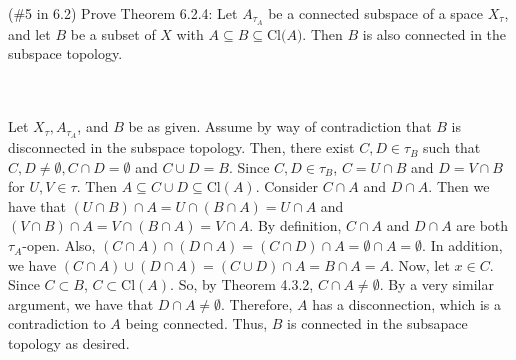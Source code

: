 (\#5 in 6.2) Prove Theorem 6.2.4: Let $A_{\tau_A}$ be a connected subspace of a space $X_{\tau}$, and
let $B$ be a subset of $X$ with $A\subseteq B\subseteq \text{Cl($A$)}$. Then $B$ is also connected in
the subspace topology.\\\\

\begin{solution}\renewcommand{\qedsymbol}{}\ \\
    Let $X_{\tau}, A_{\tau_A}$, and $B$ be as given. Assume by way of contradiction that $B$ is
    disconnected in the subspace topology. Then, there exist $C,D\in\tau_{B}$ such that
    $C,D\neq\emptyset, C\cap D=\emptyset$ and $C\cup D=B$. Since $C,D\in\tau_{B}$, $C=U\cap B$ and
    $D=V\cap B$ for $U,V\in\tau$. Then $A\subseteq C\cup D\subseteq$Cl$(A)$. Consider $C\cap A$ and
    $D\cap A$. Then we have that $(U\cap B)\cap A=U\cap(B\cap A)=U\cap A$ and
    $(V\cap B)\cap A=V\cap(B\cap A)=V\cap A$. By definition, $C\cap A$ and $D\cap A$ are both
    $\tau_A$-open. Also, $(C\cap A)\cap(D\cap A)=(C\cap D)\cap A=\emptyset\cap A=\emptyset$. In
    addition, we have $(C\cap A)\cup(D\cap A)=(C\cup D)\cap A=B\cap A=A$. Now, let $x\in C$. Since
    $C\subset B$, $C\subset$Cl$(A)$. So, by Theorem 4.3.2, $C\cap A\neq\emptyset$. By a very similar
    argument, we have that $D\cap A\neq\emptyset$. Therefore, $A$ has a disconnection, which is a
    contradiction to $A$ being connected. Thus, $B$ is connected in the subsapace topology as desired.

\end{solution}